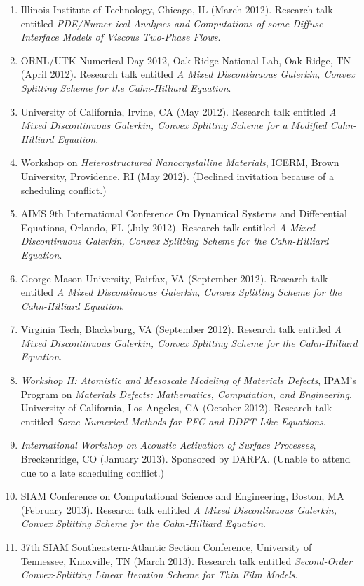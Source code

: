 \documentclass[11pt]{letter}
\begin{document}
\begin{enumerate}
	\item
Illinois Institute of Technology, Chicago, IL (March 2012). Research talk entitled {\sl PDE/Numer-ical Analyses and Computations of some Diffuse Interface Models of Viscous Two-Phase Flows}.
	\item
ORNL/UTK Numerical Day 2012, Oak Ridge National Lab, Oak Ridge, TN (April 2012). Research talk entitled {\sl A Mixed Discontinuous Galerkin, Convex Splitting Scheme for the Cahn-Hilliard Equation}.
	\item
University of California, Irvine, CA (May 2012). Research talk entitled {\sl A Mixed Discontinuous Galerkin, Convex Splitting Scheme for a Modified Cahn-Hilliard Equation}.
	\item
Workshop on {\sl Heterostructured Nanocrystalline Materials}, ICERM, Brown University, Providence, RI (May 2012). (Declined invitation because of a scheduling conflict.)
	\item
AIMS 9th International Conference On Dynamical Systems and Differential Equations, Orlando, FL (July 2012). Research talk entitled {\sl A Mixed Discontinuous Galerkin, Convex Splitting Scheme for the Cahn-Hilliard Equation}.
	\item
George Mason University, Fairfax, VA (September 2012). Research talk entitled {\sl A Mixed Discontinuous Galerkin, Convex Splitting Scheme for the Cahn-Hilliard Equation}.
	\item
Virginia Tech, Blacksburg, VA (September 2012). Research talk entitled {\sl A Mixed Discontinuous Galerkin, Convex Splitting Scheme for the Cahn-Hilliard Equation}.
	\item
{\sl Workshop II: Atomistic and Mesoscale Modeling of Materials Defects}, IPAM's Program on {\sl Materials Defects: Mathematics, Computation, and Engineering}, University of California, Los Angeles, CA (October 2012). Research talk entitled {\sl Some Numerical Methods for PFC and DDFT-Like Equations}.
	\item
{\sl International Workshop on Acoustic Activation of Surface Processes},  Breckenridge, CO (January 2013).  Sponsored by DARPA. (Unable to attend due to a late scheduling conflict.)
	\item
SIAM Conference on Computational Science and Engineering, Boston, MA (February 2013).  Research talk entitled {\sl A Mixed Discontinuous Galerkin, Convex Splitting Scheme for the Cahn-Hilliard Equation}.
	\item
37th SIAM Southeastern-Atlantic Section Conference, University of Tennessee, Knoxville, TN (March 2013).  Research talk entitled {\sl Second-Order Convex-Splitting Linear Iteration Scheme for Thin Film Models}.

\end{enumerate}
\end{document}
